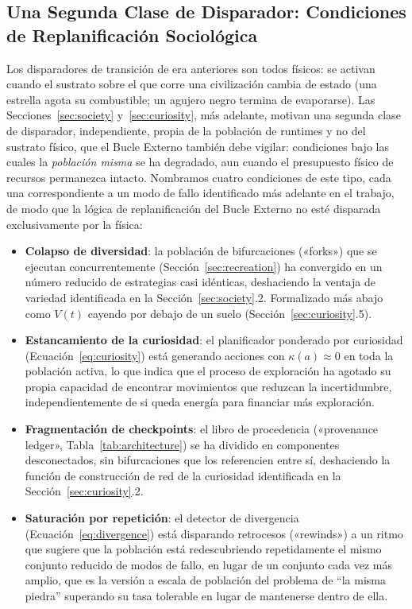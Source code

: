 \documentclass[11pt]{article}
\begin{document}
\subsection{Una Segunda Clase de Disparador: Condiciones de Replanificación Sociológica}
\label{sec:sociological-triggers}

Los disparadores de transición de era anteriores son todos físicos: se activan cuando el sustrato sobre el que corre una civilización cambia de estado (una estrella agota su combustible; un agujero negro termina de evaporarse). Las Secciones~\ref{sec:society} y~\ref{sec:curiosity}, más adelante, motivan una segunda clase de disparador, independiente, propia de la población de runtimes y no del sustrato físico, que el Bucle Externo también debe vigilar: condiciones bajo las cuales la \emph{población misma} se ha degradado, aun cuando el presupuesto físico de recursos permanezca intacto. Nombramos cuatro condiciones de este tipo, cada una correspondiente a un modo de fallo identificado más adelante en el trabajo, de modo que la lógica de replanificación del Bucle Externo no esté disparada exclusivamente por la física:

\begin{itemize}[leftmargin=1.5em]
    \item \textbf{Colapso de diversidad}: la población de bifurcaciones («forks») que se ejecutan concurrentemente (Sección~\ref{sec:recreation}) ha convergido en un número reducido de estrategias casi idénticas, deshaciendo la ventaja de variedad identificada en la Sección~\ref{sec:society}.2. Formalizado más abajo como $V(t)$ cayendo por debajo de un suelo (Sección~\ref{sec:curiosity}.5).
    \item \textbf{Estancamiento de la curiosidad}: el planificador ponderado por curiosidad (Ecuación~\ref{eq:curiosity}) está generando acciones con $\kappa(a) \approx 0$ en toda la población activa, lo que indica que el proceso de exploración ha agotado su propia capacidad de encontrar movimientos que reduzcan la incertidumbre, independientemente de si queda energía para financiar más exploración.
    \item \textbf{Fragmentación de checkpoints}: el libro de procedencia («provenance ledger», Tabla~\ref{tab:architecture}) se ha dividido en componentes desconectados, sin bifurcaciones que los referencien entre sí, deshaciendo la función de construcción de red de la curiosidad identificada en la Sección~\ref{sec:curiosity}.2.
    \item \textbf{Saturación por repetición}: el detector de divergencia (Ecuación~\ref{eq:divergence}) está disparando retrocesos («rewinds») a un ritmo que sugiere que la población está redescubriendo repetidamente el mismo conjunto reducido de modos de fallo, en lugar de un conjunto cada vez más amplio, que es la versión a escala de población del problema de ``la misma piedra'' superando su tasa tolerable en lugar de mantenerse dentro de ella.
\end{itemize}
\end{document}
